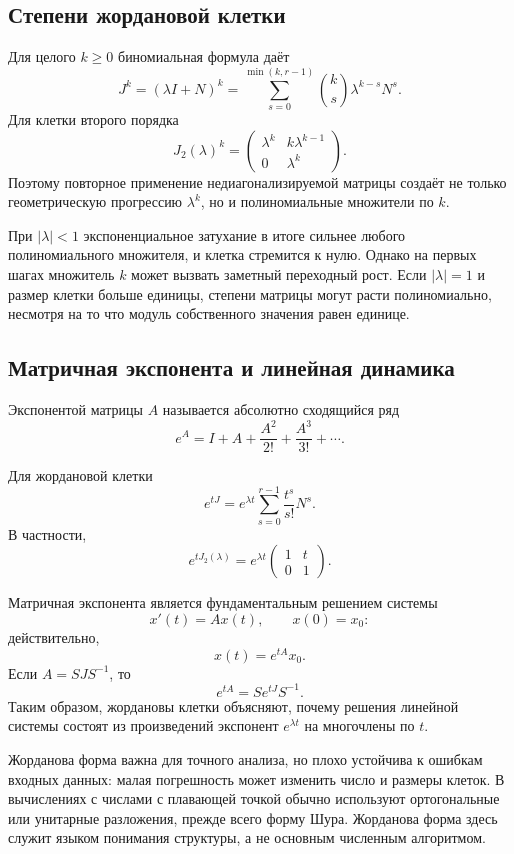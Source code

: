 \subsection{Степени жордановой клетки}

Для целого $k\geq0$ биномиальная формула даёт
\[
J^k=(\lambda I+N)^k
=
\sum_{s=0}^{\min(k,r-1)}
\binom{k}{s}\lambda^{k-s}N^s.
\]
Для клетки второго порядка
\[
J_2(\lambda)^k
=
\begin{pmatrix}
\lambda^k&k\lambda^{k-1}\\
0&\lambda^k
\end{pmatrix}.
\]
Поэтому повторное применение недиагонализируемой матрицы создаёт не только геометрическую прогрессию $\lambda^k$, но и полиномиальные множители по $k$.

При $|\lambda|<1$ экспоненциальное затухание в итоге сильнее любого полиномиального множителя, и клетка стремится к нулю. Однако на первых шагах множитель $k$ может вызвать заметный переходный рост. Если $|\lambda|=1$ и размер клетки больше единицы, степени матрицы могут расти полиномиально, несмотря на то что модуль собственного значения равен единице.

\subsection{Матричная экспонента и линейная динамика}

\begin{definition}
Экспонентой матрицы $A$ называется абсолютно сходящийся ряд
\[
e^A
=
I+A+\frac{A^2}{2!}+\frac{A^3}{3!}+\cdots.
\]
\end{definition}

Для жордановой клетки
\[
e^{tJ}
=
e^{\lambda t}
\sum_{s=0}^{r-1}\frac{t^s}{s!}N^s.
\]
В частности,
\[
e^{tJ_2(\lambda)}
=
e^{\lambda t}
\begin{pmatrix}
1&t\\
0&1
\end{pmatrix}.
\]

Матричная экспонента является фундаментальным решением системы
\[
x'(t)=Ax(t),
\qquad
x(0)=x_0:
\]
действительно,
\[
x(t)=e^{tA}x_0.
\]
Если $A=SJS^{-1}$, то
\[
e^{tA}=Se^{tJ}S^{-1}.
\]
Таким образом, жордановы клетки объясняют, почему решения линейной системы состоят из произведений экспонент $e^{\lambda t}$ на многочлены по $t$.

\begin{computationalnote}
Жорданова форма важна для точного анализа, но плохо устойчива к ошибкам входных данных: малая погрешность может изменить число и размеры клеток. В вычислениях с числами с плавающей точкой обычно используют ортогональные или унитарные разложения, прежде всего форму Шура. Жорданова форма здесь служит языком понимания структуры, а не основным численным алгоритмом.
\end{computationalnote}

